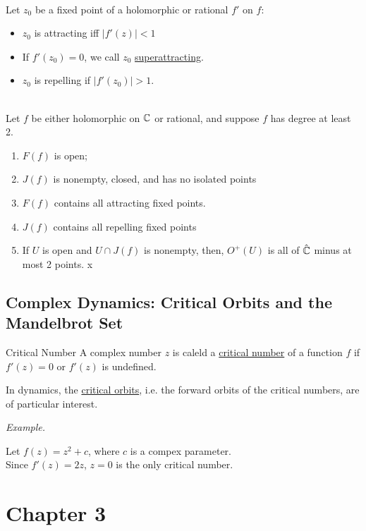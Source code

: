 \documentclass[10pt]{paper}
\newcommand{\gspc}{\vspace{0.13cm}} %
\newcommand{\gline}[0]{\gspc\\} %
\newcommand{\ul}[1]{\underline{#1}}
\renewenvironment{example}{
  \begin{tcolorbox}[colback=gray!2, colframe=gray!40!white, coltitle=green!20!black, boxrule=3pt, sharp corners, breakable]
    \textit{Example.}
}{\end{tcolorbox}}
\begin{document}
\begin{theorem}{}{}\gline{}
  Let $z_0$ be a fixed point of a holomorphic or rational $f'$ on $f$:
  \begin{itemize}
    \item $z_0$ is attracting iff $|f'(z)|<1$
    \item If $f'(z_0) = 0$, we call $z_0$ \ul{superattracting}.
    \item $z_0$ is repelling if $|f'(z_0)| > 1$. 
  \end{itemize} 
\end{theorem}
\begin{theorem}{}{}\gline{}
  Let $f$ be either holomorphic on $\mathbb{C}$ or rational, and suppose $f$ has degree at least 2. 
  \begin{enumerate}
    \item $F(f)$ is open;
    \item $J(f)$ is nonempty, closed, and has no isolated points
    \item $F(f)$ contains all attracting fixed points. 
    \item $J(f)$ contains all repelling fixed points
    \item If $U$ is open and $U\cap J(f)$ is nonempty, then, $O^+(U)$ is all of $\hat{\mathbb{C}}$ minus at most 2 points. x
  \end{enumerate}
  
\end{theorem}

\subsection*{Complex Dynamics: Critical Orbits and the Mandelbrot Set}

\begin{definition}{Critical Number}{}
  A complex number $z$ is caleld a \ul{critical number} of a function $f$ if $f'(z) = 0$ or $f'(z)$ is undefined. 
\end{definition}

In dynamics, the \ul{critical orbits}, i.e. the forward orbits of the critical numbers, are of particular interest. 
\begin{example}
  Let $f(z) = z^2 + c$, where $c$ is a compex parameter. \gline{}
  Since $f'(z) = 2z$, $z=0$ is the only critical number. 
\end{example}

\section{Chapter 3}
\addtocounter{subsection}{2}
\end{document}

